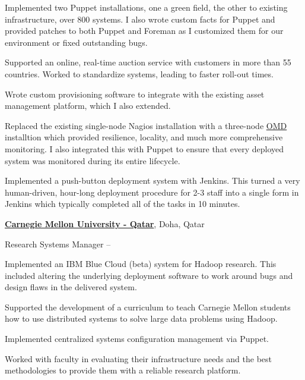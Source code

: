 \documentclass[letterpaper,10pt,oneside]{article}
\begin{document}
\begin{body}
\begin{detail}

\BulletItem
Implemented two Puppet installations, one a green field, the other to
existing infrastructure, over 800 systems.  I also wrote custom facts for
Puppet and provided patches to both Puppet and Foreman as I customized them
for our environment or fixed outstanding bugs.

\BulletItem
Supported an online, real-time auction service with customers in more than
55 countries.  Worked to standardize systems, leading to faster roll-out
times.

\BulletItem
Wrote custom provisioning software to integrate with the existing asset
management platform, which I also extended.

\BulletItem
Replaced the existing single-node Nagios installation with a three-node
\href{http://omdistro.org/}{OMD} installtion which provided resilience,
locality, and much more comprehensive monitoring.  I also integrated this
with Puppet to ensure that every deployed system was monitored during its
entire lifecycle.

\BulletItem
Implemented a push-button deployment system with Jenkins.  This turned a
very human-driven, hour-long deployment procedure for 2-3 staff into a
single form in Jenkins which typically completed all of the tasks in 10
minutes.

\end{detail}
\EntryGap


\href{http://qatar.cmu.edu/}
{\textbf{Carnegie Mellon University - Qatar}},
Doha, Qatar
\par
Research Systems Manager
\hfill
{} -- 

\begin{detail}
  

\BulletItem
Implemented an IBM Blue Cloud (beta) system for Hadoop research.  This
included altering the underlying deployment software to work around bugs
and design flaws in the delivered system.

\BulletItem
Supported the development of a curriculum to teach Carnegie Mellon students
how to use distributed systems to solve large data problems using Hadoop.

\BulletItem
Implemented centralized systems configuration management via Puppet.

\BulletItem
Worked with faculty in evaluating their infrastructure needs and the best
methodologies to provide them with a reliable research platform.


\end{detail}
\end{body}
\end{document}
